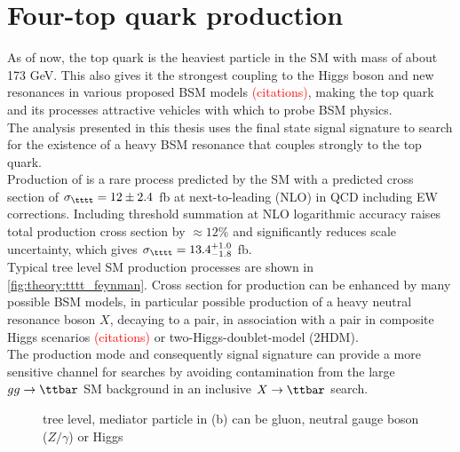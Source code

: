 \documentclass[../thesis.tex]{subfiles}
\begin{document}
\section{Four-top quark production}
\label{sec:4top}
As of now, the top quark is the heaviest particle in the \acs{SM} with mass of about 173 GeV. This also gives it the strongest coupling to the Higgs boson and new resonances in various proposed \acs{BSM} models \textcolor{red}{(citations)}, making the top quark and its processes attractive vehicles with which to probe \acs{BSM} physics.\\
The analysis presented in this thesis uses the \tttt final state signal signature to search for the existence of a heavy \acs{BSM} resonance that couples strongly to the top quark.\\
Production of \tttt is a rare process predicted by the \acs{SM} with a predicted cross section of $\sigma_{\tttt}=12\pm 2.4$ fb at next-to-leading (\acs{NLO}) in \acs{QCD} including \acs{EW} corrections. Including threshold summation at \acs{NLO} logarithmic accuracy raises total production cross section by $\approx 12\%$ and significantly reduces scale uncertainty, which gives $\sigma_{\tttt}=13.4^{+1.0}_{-1.8}$ fb. \\
Typical tree level \acs{SM} \tttt production processes are shown in \autoref{fig:theory:tttt_feynman}. Cross section for \tttt production can be enhanced by many possible \acs{BSM} models, in particular possible production of a heavy neutral resonance boson $X$, decaying to a \ttbar pair, in association with a \ttbar pair in composite Higgs scenarios \textcolor{red}{(citations)} or two-Higgs-doublet-model (\acs{2HDM}).\\
The \ttX production mode and consequently \tttt signal signature can provide a more sensitive channel for searches by avoiding contamination from the large $gg\rightarrow \ttbar$ \acs{SM} background in an inclusive $X\rightarrow\ttbar$ search.

\begin{figure}[!htbp]
\centering
{}
\caption[Caption]{\label{fig:theory:tttt_feynman}tree level, mediator particle in (b) can be gluon, neutral gauge boson ($Z/\gamma$) or Higgs \citep{tttt_obs}}
\end{figure}
\end{document}

